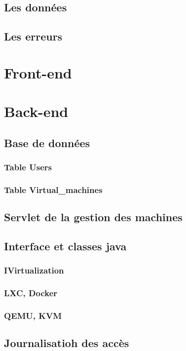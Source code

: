 \documentclass[11pt]{article}
\begin{document}
\subsection{Les données}
\subsection{Les erreurs}

\newpage
\section{Front-end}
\newpage
\section{Back-end}
\subsection{Base de données}
\subsubsection{Table Users}
\subsubsection{Table Virtual\_machines}
\subsection{Servlet de la gestion des machines}
\subsection{Interface et classes java}
\subsubsection{IVirtualization}
\subsubsection{LXC, Docker}
\subsubsection{QEMU, KVM}

\subsection{Journalisatioh des accès}
\end{document}
